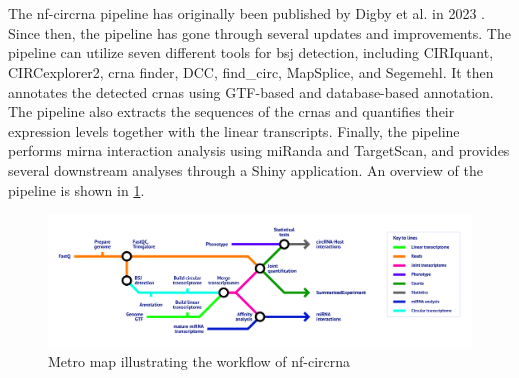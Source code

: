 \section{}
\label{sec:nf-core_circrna}
The \gls{nf-circrna} pipeline has originally been published by Digby et al.
in
2023 \supercite{digby_nf-corecircrna_2023}.
Since then, the pipeline has gone through several updates and improvements.
The pipeline can utilize seven different tools for \gls{bsj} detection,
including CIRIquant, CIRCexplorer2, \gls{crna} finder, DCC, find\_circ,
MapSplice, and Segemehl.
It then annotates the detected \glspl{crna} using GTF-based and database-based
annotation.
The pipeline also extracts the sequences of the \glspl{crna} and quantifies
their expression levels together with the linear transcripts.
Finally, the pipeline performs \gls{mirna} interaction analysis using miRanda
and TargetScan, and provides several downstream analyses through a Shiny
application.
An overview of the pipeline is shown in \cref{fig:circrna_pipeline}.

\begin{figure}[ht]
    \centering

    \includegraphics[width=\textwidth]{chapters/3_materials_and_methods/figures/nf-core_circrna.png}
    \caption{Metro map illustrating the workflow of \gls{nf-circrna}}
    \label{fig:circrna_pipeline}
\end{figure}





